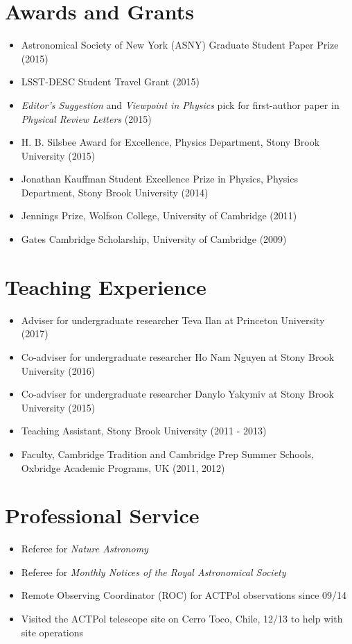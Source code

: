 \documentclass[10pt,margin]{res}
\begin{document}
\begin{resume}
\section{Awards and Grants}
\par
\begin{itemize}
\item Astronomical Society of New York (ASNY) Graduate Student Paper Prize (2015)
\item LSST-DESC Student Travel Grant (2015)
\item {\sl Editor's Suggestion} and {\sl Viewpoint in Physics} pick for first-author paper in {\sl Physical Review Letters} (2015)
\item H. B. Silsbee Award for Excellence, Physics Department, Stony Brook University (2015)
\item Jonathan Kauffman Student Excellence Prize in Physics, Physics Department, Stony Brook University (2014)
\item Jennings Prize, Wolfson College, University of Cambridge (2011)
\item Gates Cambridge Scholarship, University of Cambridge (2009) %
\end{itemize}

\section{Teaching Experience}
\begin{itemize}
\item Adviser for undergraduate researcher Teva Ilan at Princeton University (2017)
\item Co-adviser for undergraduate researcher Ho Nam Nguyen at Stony Brook University (2016)
\item Co-adviser for undergraduate researcher Danylo Yakymiv at Stony Brook University (2015)
\item Teaching Assistant, Stony Brook University (2011 - 2013)
\item Faculty, Cambridge Tradition and Cambridge Prep Summer Schools, Oxbridge Academic Programs, UK (2011, 2012)
\end{itemize}

\section{Professional Service}
\begin{itemize}
\item Referee for {\sl Nature Astronomy}
\item Referee for {\sl Monthly Notices of the Royal Astronomical Society}
\item Remote Observing Coordinator (ROC) for ACTPol observations since 09/14
\item Visited the ACTPol telescope site on Cerro Toco, Chile, 12/13 to help with site operations
\end{itemize}


\end{resume}
\end{document}
